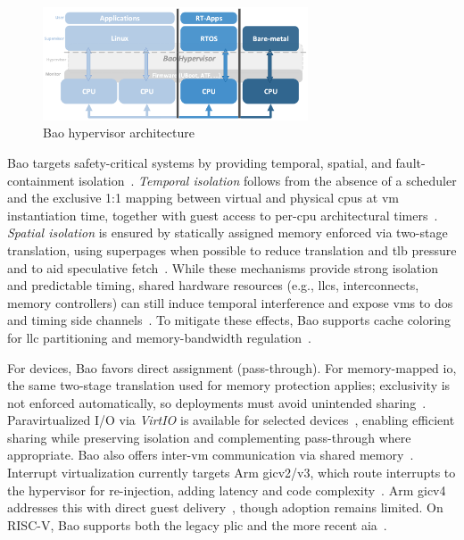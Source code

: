 \begin{figure}[!hbtp]
  \centering
  \includegraphics[width=0.7\textwidth]{./img/png/bao-arch}
  \caption[Bao hypervisor architecture]{Bao hypervisor architecture~\cite{martins_et_al:OASIcs:2020:11779}\footnotemark}%
  \label{fig:bao-arch}
\end{figure}
%

Bao targets safety-critical systems by providing temporal, spatial, and
fault-containment isolation~\cite{martins_et_al:OASIcs:2020:11779}. \emph{Temporal isolation}
follows from the absence of a scheduler and the exclusive 1:1 mapping between
virtual and physical \glspl{cpu} at \gls{vm} instantiation time, together with
guest access to per-\gls{cpu} architectural timers~\cite{martins_et_al:OASIcs:2020:11779}.
\emph{Spatial isolation} is ensured by statically assigned memory enforced via
two-stage translation, using superpages when possible to reduce translation and
\gls{tlb} pressure and to aid speculative fetch~\cite{martins_et_al:OASIcs:2020:11779}.
While these mechanisms provide strong isolation and predictable timing,
shared hardware resources (e.g., \glspl{llc}, interconnects, memory
controllers) can still induce temporal interference and expose \glspl{vm} to
\gls{dos} and timing side channels~\cite{bansal2018evaluating,barham2003xen,ge2018survey}.
To mitigate these effects, Bao supports cache coloring for \gls{llc}
partitioning and memory-bandwidth regulation~\cite{martins_et_al:OASIcs:2020:11779}.

For devices, Bao favors direct assignment (pass-through). For memory-mapped
\gls{io}, the same two-stage translation used for memory protection applies;
exclusivity is not enforced automatically, so deployments must avoid unintended
sharing~\cite{martins_et_al:OASIcs:2020:11779}. Paravirtualized I/O via
\emph{VirtIO} is available for selected
devices~\cite{costa2022virtio,ribeiro2023virtio,rocha_mitigating_2023,peixoto-virtio-2024,baoRepo},
enabling efficient sharing while preserving isolation and complementing
pass-through where appropriate. Bao also offers inter-\gls{vm}
communication via shared
memory~\cite{martins_et_al:OASIcs:2020:11779,baoEmbeddedWorld2020}.
%
Interrupt virtualization currently targets Arm \gls{gic}v2/v3, which route
interrupts to the hypervisor for re-injection, adding latency and code
complexity~\cite{martins_et_al:OASIcs:2020:11779}. Arm \gls{gic}v4 addresses
this with direct guest delivery~\cite{arm-gicv4,dall2018design}, though adoption
remains limited. On RISC-V, Bao supports both the legacy \gls{plic} and the more
recent \gls{aia}~\cite{marques_interrupting_2024,baoRepo}.

